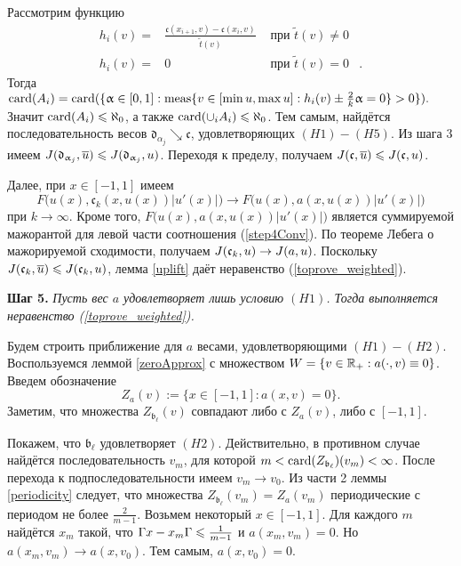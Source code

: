 Рассмотрим функцию
$$
\begin{aligned}
h_i(v) = & \frac{\mathfrak c(x_{i + 1}, v) - \mathfrak c(x_i, v)}{\tilde{t} (v)} & \text{ при } \tilde{t} (v) \neq 0 & \\
h_i(v) = & 0 & \text{ при } \tilde{t} (v) = 0 &.
\end{aligned}
$$
Тогда $\card(A_i) = \card(\{ \alpha \in [0, 1]: \meas \{ v \in [\min u, \max u]: h_i(v) \pm \frac{2}{k} \alpha = 0 \} > 0 \}).$
Значит $\operatorname{card}(A_i) \leqslant \aleph_0$, а также $\operatorname{card}(\cup_i A_i) \leqslant \aleph_0$.
Тем самым, найдётся последовательность весов $\mathfrak d_{\alpha_j} \searrow \mathfrak c$, удовлетворяющих $(H1)-(H5)$.
Из шага 3 имеем $\IWg(\mathfrak d_{\alpha_j}, \mon{u}) \le \IWg(\mathfrak d_{\alpha_j}, u)$.
Переходя к пределу, получаем $\IWg(\mathfrak c, \mon{u}) \le \IWg(\mathfrak c, u)$.

Далее, при $x \in [-1, 1]$ имеем
\begin{equation}
\label{step4Conv}
F \bigl( u(x), \mathfrak c_k(x, u(x)) |u'(x)| \bigr) \to F \bigl( u(x), a(x, u(x)) |u'(x)| \bigr)
\end{equation}
при $k \to \infty$.
Кроме того, $F \bigl( u(x), a(x, u(x)) |u'(x)| \bigr)$ является суммируемой мажорантой для левой части соотношения (\ref{step4Conv}).
По теореме Лебега о мажорируемой сходимости, получаем $J(\mathfrak c_k, u) \to J(a, u)$.
Поскольку $\IWg(\mathfrak c_k, \mon{u}) \le \IWg(\mathfrak c_k, u)$, лемма \ref{uplift} даёт неравенство (\ref{toprove_weighted}).

\bigskip
\textbf{Шаг 5.}
\textit{Пусть вес $a$ удовлетворяет лишь условию $(H1)$.
Тогда выполняется неравенство (\ref{toprove_weighted}).}

Будем строить приближение для $a$ весами, удовлетворяющими $(H1)-(H2)$.
Воспользуемся леммой \ref{zeroApprox} с множеством $W = \{ v \in \mathbb R_+: a(\cdot, v) \equiv 0 \}$.
Введем обозначение
$$
Z_a(v) := \{ x \in [-1, 1]: a(x, v) = 0 \}.
$$
Заметим, что множества $Z_{\mathfrak b_{\ell}}(v)$ совпадают либо с $Z_{a}(v)$, либо с $[-1, 1]$.

Покажем, что  $\mathfrak b_{\ell}$ удовлетворяет $(H2)$.
Действительно, в противном случае найдётся последовательность $v_m$, для которой
$m < \operatorname{card}(Z_{\mathfrak b_{\ell}})(v_m) < \infty$.
После перехода к подпоследовательности имеем $v_m \to v_0$.
Из части 2 леммы \ref{periodicity} следует,
что множества $Z_{\mathfrak b_{\ell}}(v_m) = Z_{a}(v_m)$ периодические с периодом не более $\frac{2}{m - 1}$.
Возьмем некоторый $x \in [-1, 1]$.
Для каждого $m$ найдётся $x_m$ такой, что
$\abs{x - x_m} \le \frac{1}{m - 1}$ и $a(x_m, v_m) = 0$.
Но $a(x_m, v_m) \to a(x, v_0)$.
Тем самым, $a(x, v_0) = 0$.

